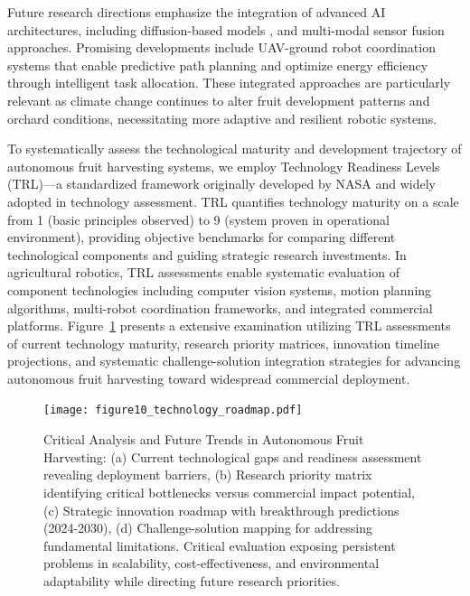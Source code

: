 \documentclass{ieeeaccess}
\begin{document}
Future research directions emphasize the integration of advanced AI architectures, including diffusion-based models \cite{heschl2024synthset}, and multi-modal sensor fusion approaches. Promising developments include UAV-ground robot coordination systems that enable predictive path planning and optimize energy efficiency through intelligent task allocation. These integrated approaches are particularly relevant as climate change continues to alter fruit development patterns and orchard conditions, necessitating more adaptive and resilient robotic systems.

To systematically assess the technological maturity and development trajectory of autonomous fruit harvesting systems, we employ Technology Readiness Levels (TRL)—a standardized framework originally developed by NASA and widely adopted in technology assessment. TRL quantifies technology maturity on a scale from 1 (basic principles observed) to 9 (system proven in operational environment), providing objective benchmarks for comparing different technological components and guiding strategic research investments. In agricultural robotics, TRL assessments enable systematic evaluation of component technologies including computer vision systems, motion planning algorithms, multi-robot coordination frameworks, and integrated commercial platforms. Figure~\ref{fig:future_directions_roadmap} presents a extensive examination utilizing TRL assessments of current technology maturity, research priority matrices, innovation timeline projections, and systematic challenge-solution integration strategies for advancing autonomous fruit harvesting toward widespread commercial deployment.

\begin{figure}[htbp]
\centering
\texttt{[image: figure10\_technology\_roadmap.pdf]} %
\caption{Critical Analysis and Future Trends in Autonomous Fruit Harvesting: (a) Current technological gaps and readiness assessment revealing deployment barriers, (b) Research priority matrix identifying critical bottlenecks versus commercial impact potential, (c) Strategic innovation roadmap with breakthrough predictions (2024-2030), (d) Challenge-solution mapping for addressing fundamental limitations. Critical evaluation exposing persistent problems in scalability, cost-effectiveness, and environmental adaptability while directing future research priorities.}
\label{fig:future_directions_roadmap}
\end{figure}
\end{document}
